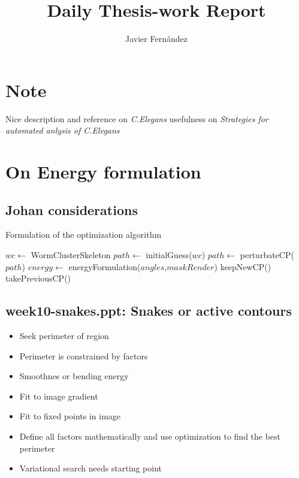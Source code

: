 \documentclass{article}
\title{Daily Thesis-work Report}
\author{Javier Fern\'andez}
\begin{document}
\maketitle

\section{Note}
Nice description and reference on \emph{C.Elegans} usefulness on
\emph{Strategies for automated anlysis of C.Elegans}

\section{On Energy formulation}
\subsection*{Johan considerations}
\begin{algorithm}                      
\caption{Formulation of the optimization algorithm}         
\label{alg1}                          
\begin{algorithmic}                   
\REQUIRE $wc \gets $ WormClusterSkeleton
\STATE $path \gets$ initialGuess($wc$)
\STATE $path \gets$ perturbateCP($path$)
\STATE $energy \gets$ energyFormulation($angles$,$maskRender$)
\STATE keepNewCP()
\ELSE
\STATE takePreviousCP()
\ENDIF
\ENDWHILE
\end{algorithmic}
\end{algorithm}

\subsection{week10-snakes.ppt: Snakes or active contours}
\begin{itemize}
\item Seek perimeter of region
\item Perimeter is constrained by factors
\item Smoothnes or bending energy
\item Fit to image gradient
\item Fit to fixed points in image
\item Define all factors mathematically and use
  optimization to find the best perimeter
\item Variational search needs starting point
\end{itemize}
\end{document}
